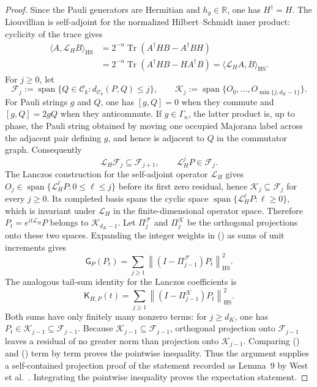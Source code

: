 \documentclass[twoside,10pt]{article}
\numberwithin{equation}{section}
\theoremstyle{slbody}
\theoremstyle{definition}
\theoremstyle{remark}
\newcommand{\1}{\mathbf{1}}
\renewcommand{\eqref}[1]{%
  \textup{{\normalfont(\oldstylenums{\ref{#1}}}\normalfont)}}
\begin{document}
\begin{proof}
Since the Pauli generators are Hermitian and $h_g\in\mathbb R$, one has
$H^\dagger=H$.  The Liouvillian is self-adjoint for the normalized
Hilbert--Schmidt inner product: cyclicity of the trace gives
\begin{align*}
 \langle A,\mathcal L_HB\rangle_{\mathrm{HS}}
 &=2^{-n}\operatorname{Tr}(A^\dagger HB-A^\dagger BH)\\
 &=2^{-n}\operatorname{Tr}(A^\dagger HB-HA^\dagger B)
 =\langle\mathcal L_HA,B\rangle_{\mathrm{HS}}.
\end{align*}
For $j\geq0$, let
\[
 \mathcal F_j:=\operatorname{span}\{Q\in\mathcal C_k:
 d_{\mathcal C_k}(P,Q)\leq j\},
 \qquad
 \mathcal K_j:=\operatorname{span}
 \{O_0,\ldots,O_{\min\{j,d_K-1\}}\}.
\]
For Pauli strings $g$ and $Q$, one has $[g,Q]=0$ when they commute and
$[g,Q]=2gQ$ when they anticommute.  If $g\in\Gamma_n$, the latter product is,
up to phase, the Pauli string obtained by moving one occupied Majorana label
across the adjacent pair defining $g$, and hence is adjacent to $Q$ in the
commutator graph.  Consequently
\[
 \mathcal L_H\mathcal F_j\subseteq\mathcal F_{j+1},
 \qquad \mathcal L_H^jP\in\mathcal F_j.
\]
The Lanczos construction for the self-adjoint operator $\mathcal L_H$ gives
$O_j\in\operatorname{span}\{\mathcal L_H^\ell P:0\leq\ell\leq j\}$
before its first zero residual, hence
$\mathcal K_j\subseteq\mathcal F_j$ for every $j\geq0$.  Its completed basis
spans the cyclic space $\operatorname{span}\{\mathcal L_H^\ell P:\ell\geq0\}$,
which is invariant under $\mathcal L_H$ in the finite-dimensional operator space.
Therefore $P_t=e^{it\mathcal L_H}P$ belongs to $\mathcal K_{d_K-1}$.
Let $\Pi_j^{\mathcal F}$ and $\Pi_j^{\mathcal K}$ be the orthogonal projections
onto these two spaces.  Expanding the integer weights in
\eqref{eq:graph-complexity-definition} as sums of unit increments gives
\begin{equation}\label{eq:graph-tail-projections}
 \mathsf G_P(P_t)
 =\sum_{j\geq1}\left\|(I-\Pi_{j-1}^{\mathcal F})P_t\right\|_{\mathrm{HS}}^2.
\end{equation}
The analogous tail-sum identity for the Lanczos coefficients is
\begin{equation}\label{eq:krylov-tail-projections}
 \mathsf K_{H,P}(t)
 =\sum_{j\geq1}\left\|(I-\Pi_{j-1}^{\mathcal K})P_t\right\|_{\mathrm{HS}}^2.
\end{equation}
Both sums have only finitely many nonzero terms: for $j\geq d_K$, one has
$P_t\in\mathcal K_{j-1}\subseteq\mathcal F_{j-1}$.
Because $\mathcal K_{j-1}\subseteq\mathcal F_{j-1}$, orthogonal projection
onto $\mathcal F_{j-1}$ leaves a residual of no greater norm than projection
onto $\mathcal K_{j-1}$.  Comparing
\eqref{eq:graph-tail-projections} and
\eqref{eq:krylov-tail-projections} term by term proves the pointwise
inequality.  Thus the argument supplies a self-contained projection proof of
the statement recorded as Lemma~9 by West et
al.~\cite[Lemma~9 and Eqs.~(A78)--(A86)]{WestEtAl}.  Integrating
the pointwise inequality proves the expectation statement.
\end{proof}
\end{document}
